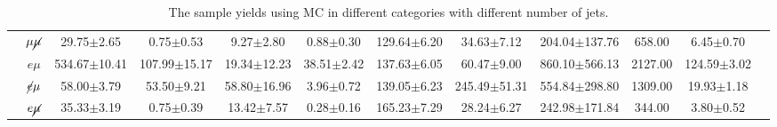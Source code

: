 \begin{table}[!ht]
\begin{center}
{\begin{tabular}{c|ccccccccccc}
&$\mu\cancel{\mu}$ &29.75$\pm$2.65    &0.75$\pm$0.53    &9.27$\pm$2.80    &0.88$\pm$0.30    &129.64$\pm$6.20    &34.63$\pm$7.12    &204.04$\pm$137.76    &658.00    &6.45$\pm$0.70 \\
&$e\mu$ &534.67$\pm$10.41    &107.99$\pm$15.17    &19.34$\pm$12.23    &38.51$\pm$2.42    &137.63$\pm$6.05    &60.47$\pm$9.00    &860.10$\pm$566.13    &2127.00    &124.59$\pm$3.02 \\
&$\cancel{e}\mu$ &58.00$\pm$3.79    &53.50$\pm$9.21    &58.80$\pm$16.96    &3.96$\pm$0.72    &139.05$\pm$6.23    &245.49$\pm$51.31    &554.84$\pm$298.80    &1309.00    &19.93$\pm$1.18 \\
&$e\cancel{\mu}$ &35.33$\pm$3.19    &0.75$\pm$0.39    &13.42$\pm$7.57    &0.28$\pm$0.16    &165.23$\pm$7.29    &28.24$\pm$6.27    &242.98$\pm$171.84    &344.00    &3.80$\pm$0.52 \\
\hline
\end{tabular}}
\caption{The sample yields using MC in different categories with different number of jets.}
\label{tab:MC_preselection}
\end{center}
\end{table}
